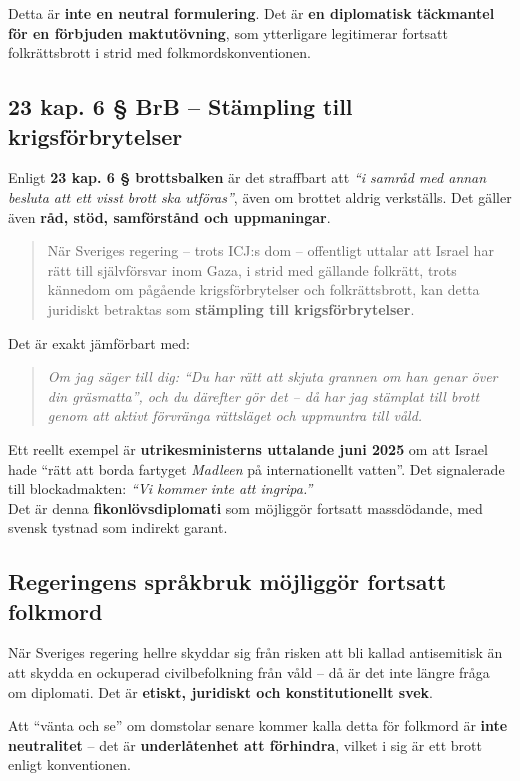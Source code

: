 \noindent
Detta är \textbf{inte en neutral formulering}. Det är \textbf{en diplomatisk täckmantel för en förbjuden maktutövning}, som ytterligare legitimerar fortsatt folkrättsbrott i strid med folkmordskonventionen.


\bigskip
\subsection*{23 kap. 6 § BrB – Stämpling till krigsförbrytelser}
Enligt \textbf{23 kap. 6 § brottsbalken} är det straffbart att \textit{“i samråd med annan besluta att ett visst brott ska utföras”}, även om brottet aldrig verkställs. Det gäller även \textbf{råd, stöd, samförstånd och uppmaningar}.

\begin{quote}
När Sveriges regering – trots ICJ:s dom – offentligt uttalar att Israel har rätt till självförsvar inom Gaza, i strid med gällande folkrätt, trots kännedom om pågående krigsförbrytelser och folkrättsbrott, kan detta juridiskt betraktas som \textbf{stämpling till krigsförbrytelser}.
\end{quote}

\noindent
Det är exakt jämförbart med:
\begin{quote}
\textit{Om jag säger till dig: “Du har rätt att skjuta grannen om han genar över din gräsmatta”, och du därefter gör det – då har jag stämplat till brott genom att aktivt förvränga rättsläget och uppmuntra till våld.}
\end{quote}

\noindent
Ett reellt exempel är \textbf{utrikesministerns uttalande juni 2025} om att Israel hade “rätt att borda fartyget \textit{Madleen} på internationellt vatten”. Det signalerade till blockadmakten: \textit{“Vi kommer inte att ingripa.”}\\

\noindent
Det är denna \textbf{fikonlövsdiplomati} som möjliggör fortsatt massdödande, med svensk tystnad som indirekt garant.

\bigskip
\subsection*{Regeringens språkbruk möjliggör fortsatt folkmord}
När Sveriges regering hellre skyddar sig från risken att bli kallad antisemitisk än att skydda en ockuperad civilbefolkning från våld – då är det inte längre fråga om diplomati. Det är \textbf{etiskt, juridiskt och konstitutionellt svek}.

\noindent
Att “vänta och se” om domstolar senare kommer kalla detta för folkmord är \textbf{inte neutralitet} – det är \textbf{underlåtenhet att förhindra}, vilket i sig är ett brott enligt konventionen.
